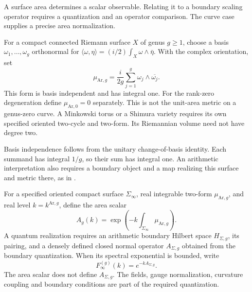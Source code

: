A surface area determines a scalar observable. Relating it to a
boundary scaling operator requires a quantization and an operator
comparison. The curve case supplies a precise area normalization.

\begin{definition}
\label{v4-arith:w9-r6:def:arakelov-kahler-g}
For a compact connected Riemann surface \(X\) of genus \(g\ge1\),
choose a basis \(\omega_1,\ldots,\omega_g\) orthonormal for
\(\langle\omega,\eta\rangle=(i/2)\int_X\omega\wedge\bar\eta\).
With the complex orientation, set
\begin{equation}
 \mu_{\mathrm{Ar},g}=\frac{i}{2g}
      \sum_{j=1}^g\omega_j\wedge\overline{\omega_j}.
 \label{v4-arith:w9-r6:eq:arakelov-kahler-g}
\end{equation}
This form is basis independent and has integral one.
For the rank-zero degeneration define \(\mu_{\mathrm{Ar},0}=0\)
separately. This is not the unit-area metric on a genus-zero curve.
A Minkowski torus or a Shimura variety requires its own specified
oriented two-cycle and two-form. Its Riemannian volume need not
have degree two.
\end{definition}

Basis independence follows from the unitary change-of-basis identity.
Each summand has integral \(1/g\), so their sum has integral one.
An arithmetic interpretation also requires a boundary object and a
map realizing this surface and metric there, as in
.

\begin{definition}
\label{v4-arith:w9-r6:def:wilson-surface-g}
For a specified oriented compact surface \(\Sigma_\infty\), real
integrable two-form \(\mu_{\mathrm{Ar},g}\), and real level
\(k=k^{\mathrm{Ar},g}\), define the area scalar
\begin{equation}
 A_g(k)=\exp\left(-k\int_{\Sigma_\infty}\mu_{\mathrm{Ar},g}\right).
 \label{v4-arith:w9-r6:eq:wilson-surface-g-def}
\end{equation}
A quantum realization requires an arithmetic boundary Hilbert space
\(H_{\Sigma,g}\), its pairing, and a densely defined closed normal
operator \(A_{\Sigma,g}\) obtained from the boundary quantization.
When its spectral exponential is bounded, write
\begin{equation}
 F^{(g)}_\infty(k)=e^{-kA_{\Sigma,g}}.
 \label{v4-arith:w9-r6:eq:wilson-surface-g-op}
\end{equation}
The area scalar does not define \(A_{\Sigma,g}\). The fields, gauge
normalization, curvature coupling and boundary conditions are part
of the required quantization.
\end{definition}

